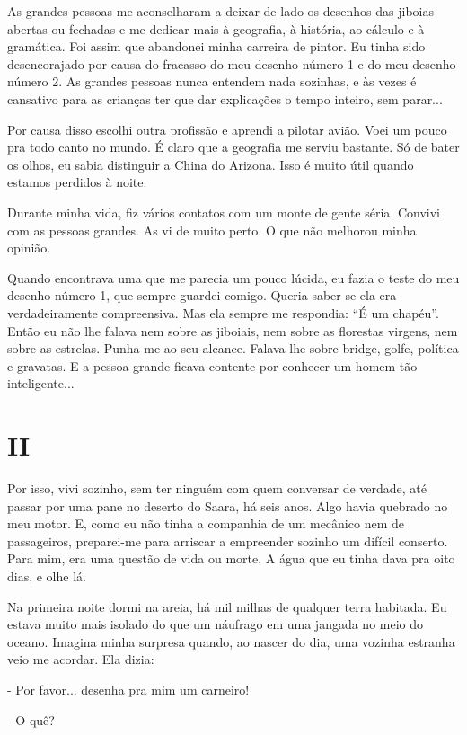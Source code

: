 As grandes pessoas me aconselharam a deixar de lado os desenhos das
jiboias abertas ou fechadas e me dedicar mais à geografia, à história,
ao cálculo e à gramática. Foi assim que abandonei minha carreira de
pintor. Eu tinha sido desencorajado por causa do fracasso do meu desenho
número 1 e do meu desenho número 2. As grandes pessoas nunca entendem
nada sozinhas, e às vezes é cansativo para as crianças ter que dar
explicações o tempo inteiro, sem parar...

Por causa disso escolhi outra profissão e aprendi a pilotar avião. Voei
um pouco pra todo canto no mundo. É claro que a geografia me serviu
bastante. Só de bater os olhos, eu sabia distinguir a China do Arizona.
Isso é muito útil quando estamos perdidos à noite.

Durante minha vida, fiz vários contatos com um monte de gente séria.
Convivi com as pessoas grandes. As vi de muito perto. O que não melhorou
minha opinião.

Quando encontrava uma que me parecia um pouco lúcida, eu fazia o teste
do meu desenho número 1, que sempre guardei comigo. Queria saber se ela
era verdadeiramente compreensiva. Mas ela sempre me respondia: ``É um
chapéu''. Então eu não lhe falava nem sobre as jiboiais, nem sobre as
florestas virgens, nem sobre as estrelas. Punha-me ao seu alcance.
Falava-lhe sobre bridge, golfe, política e gravatas. E a pessoa grande
ficava contente por conhecer um homem tão inteligente...

\chapter{II}

Por isso, vivi sozinho, sem ter ninguém com quem conversar de verdade,
até passar por uma pane no deserto do Saara, há seis anos. Algo havia
quebrado no meu motor. E, como eu não tinha a companhia de um mecânico
nem de passageiros, preparei-me para arriscar a empreender sozinho um
difícil conserto. Para mim, era uma questão de vida ou morte. A água que
eu tinha dava pra oito dias, e olhe lá.

Na primeira noite dormi na areia, há mil milhas de qualquer terra
habitada. Eu estava muito mais isolado do que um náufrago em uma jangada
no meio do oceano. Imagina minha surpresa quando, ao nascer do dia, uma
vozinha estranha veio me acordar. Ela dizia:

- Por favor... desenha pra mim um carneiro!

- O quê?

